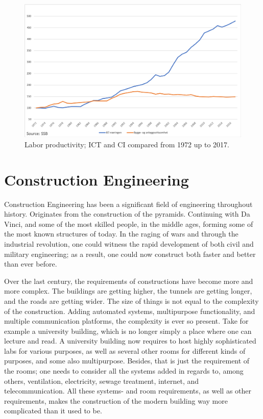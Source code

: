 \begin{figure}
    \centering
    \includegraphics[width=\textwidth]{fig/ICT_BA_1972.png}
    \caption{Labor productivity; ICT and CI compared from 1972 up to 2017.}
    \label{fig:ICT_BA_1972}
\end{figure}

\section{Construction Engineering}
Construction Engineering has been a significant field of engineering throughout history. Originates from the construction of the pyramids. Continuing with Da Vinci, and some of the most skilled people, in the middle ages, forming some of the most known structures of today. In the raging of wars and through the industrial revolution, one could witness the rapid development of both civil and military engineering; as a result, one could now construct both faster and better than ever before.

Over the last century, the requirements of constructions have become more and more complex. The buildings are getting higher, the tunnels are getting longer, and the roads are getting wider. The size of things is not equal to the complexity of the construction. Adding automated systems, multipurpose functionality, and multiple communication platforms, the complexity is ever so present. Take for example a university building, which is no longer simply a place where one can lecture and read. A university building now requires to host highly sophisticated labs for various purposes, as well as several other rooms for different kinds of purposes, and some also multipurpose. Besides, that is just the requirement of the rooms; one needs to consider all the systems added in regards to, among others, ventilation, electricity, sewage treatment, internet, and telecommunication. All these systems- and room requirements, as well as other requirements, makes the construction of the modern building way more complicated than it used to be. 

